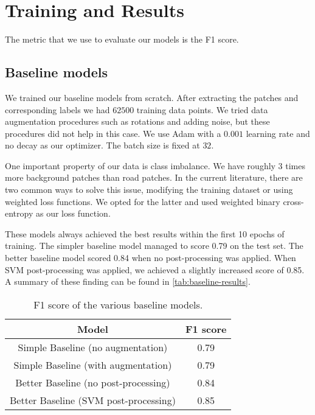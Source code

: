 \section{Training and Results}
The metric that we use to evaluate our models is the F1 score.

\subsection{Baseline models} \label{subsec:training-baselines}
We trained our baseline models from scratch. After extracting the patches and corresponding labels we had $62500$ training data points. We tried data augmentation procedures such as rotations and adding noise, but these procedures did not help in this case. We use Adam with a $0.001$ learning rate and no decay as our optimizer. The batch size is fixed at $32$.

One important property of our data is class imbalance. We have roughly $3$ times more background patches than road patches. In the current literature, there are two common ways to solve this issue, modifying the training dataset or using weighted loss functions. We opted for the latter and used weighted binary cross-entropy as our loss function.

These models always achieved the best results within the first 10 epochs of training. The simpler baseline model managed to score 0.79 on the test set. The better baseline model scored 0.84 when no post-processing was applied. When SVM post-processing was applied, we achieved a slightly increased score of 0.85. A summary of these finding can be found in \autoref{tab:baseline-results}.

\begin{table}[h]
    \centering
    \begin{tabular}{|c|c|}
        \hline
        \textbf{Model} & \textbf{F1 score} \\
        \hline
        \hline
        Simple Baseline (no augmentation) & 0.79 \\
        \hline
        Simple Baseline (with augmentation) & 0.79 \\
        \hline
        Better Baseline (no post-processing) & 0.84 \\
        \hline
        Better Baseline (SVM post-processing) & 0.85 \\
        \hline
    \end{tabular}
    \caption{F1 score of the various baseline models.}
    \label{tab:baseline-results}
\end{table}

